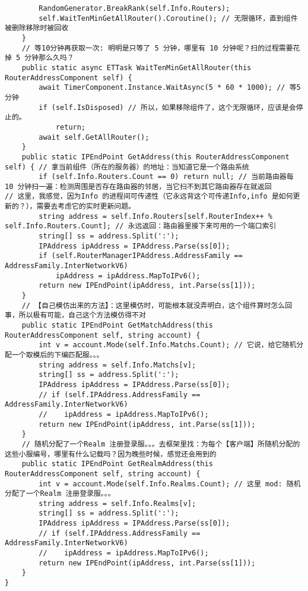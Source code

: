 \documentclass[9pt, b5paper]{article}
\begin{document}
\begin{verbatim}
        RandomGenerator.BreakRank(self.Info.Routers);
        self.WaitTenMinGetAllRouter().Coroutine(); // 无限循环，直到组件被删除移除时被回收 
    }
    // 等10分钟再获取一次: 明明是只等了 5 分钟，哪里有 10 分钟呢？扫的过程需要花掉 5 分钟那么久吗？
    public static async ETTask WaitTenMinGetAllRouter(this RouterAddressComponent self) {
        await TimerComponent.Instance.WaitAsync(5 * 60 * 1000); // 等5 分钟
        if (self.IsDisposed) // 所以，如果移除组件了，这个无限循环，应该是会停止的。
            return;
        await self.GetAllRouter();
    }
    public static IPEndPoint GetAddress(this RouterAddressComponent self) { // 拿当前组件（所在的服务器）的地址：当知道它是一个路由系统
        if (self.Info.Routers.Count == 0) return null; // 当前路由器每 10 分钟扫一遍：检测周围是否存在路由器的邻居，当它扫不到其它路由器存在就返回
// 这里，我感觉，因为Info 的进程间可传递性（它永远背这个可传递Info,info 是如何更新的？），需要去考虑它的实时更新问题。
        string address = self.Info.Routers[self.RouterIndex++ % self.Info.Routers.Count]; // 永远返回：路由器里接下来可用的一个端口索引
        string[] ss = address.Split(':');
        IPAddress ipAddress = IPAddress.Parse(ss[0]);
        if (self.RouterManagerIPAddress.AddressFamily == AddressFamily.InterNetworkV6) 
            ipAddress = ipAddress.MapToIPv6();
        return new IPEndPoint(ipAddress, int.Parse(ss[1]));
    }
    // 【自己模仿出来的方法】：这里模仿时，可能根本就没弄明白，这个组件算时怎么回事，所以极有可能，自己这个方法模仿得不对
    public static IPEndPoint GetMatchAddress(this RouterAddressComponent self, string account) {
        int v = account.Mode(self.Info.Matchs.Count); // 它说，给它随机分配一个取模后的下编匹配服。。。
        string address = self.Info.Matchs[v];
        string[] ss = address.Split(':');
        IPAddress ipAddress = IPAddress.Parse(ss[0]);
        // if (self.IPAddress.AddressFamily == AddressFamily.InterNetworkV6) 
        //    ipAddress = ipAddress.MapToIPv6();
        return new IPEndPoint(ipAddress, int.Parse(ss[1]));
    }
    // 随机分配了一个Realm 注册登录服。。。去框架里找：为每个【客户端】所随机分配的这些小服编号，哪里有什么记载吗？因为晚些时候，感觉还会用到的
    public static IPEndPoint GetRealmAddress(this RouterAddressComponent self, string account) {
        int v = account.Mode(self.Info.Realms.Count); // 这里 mod: 随机分配了一个Realm 注册登录服。。。
        string address = self.Info.Realms[v];
        string[] ss = address.Split(':');
        IPAddress ipAddress = IPAddress.Parse(ss[0]);
        // if (self.IPAddress.AddressFamily == AddressFamily.InterNetworkV6) 
        //    ipAddress = ipAddress.MapToIPv6();
        return new IPEndPoint(ipAddress, int.Parse(ss[1]));
    }
}
\end{verbatim}
\end{document}
